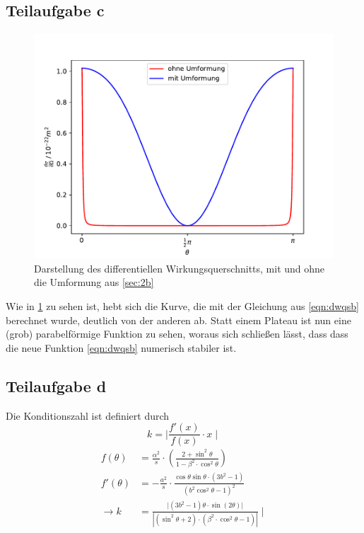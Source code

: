 \subsection{Teilaufgabe c}
\begin{figure}[H]
  \centering
  \includegraphics[width=\textwidth]{Aufgabe02/diffquerschnitt.pdf}
  \caption{Darstellung des differentiellen Wirkungsquerschnitts, mit und ohne die Umformung aus \ref{sec:2b} }
  \label{fig:2b}
\end{figure}
Wie in \ref{fig:2b} zu sehen ist, hebt sich die Kurve, die mit der Gleichung aus \eqref{eqn:dwqsb} berechnet wurde, deutlich von der anderen ab.
Statt einem Plateau ist nun eine (grob) parabelförmige Funktion zu sehen, woraus sich schließen lässt, dass dass die neue Funktion \eqref{eqn:dwqsb} numerisch stabiler ist.

\subsection{Teilaufgabe d} \label{sec:2d}
Die Konditionszahl ist definiert durch
\begin{equation}
  k=\mid \frac{f'(x)}{f(x)} \cdot x \mid
\end{equation}
\begin{align}
  f(\theta) &= \frac{\alpha ^2}{s} \cdot \left(\frac{2+\sin^2{\theta}}{1-\beta^2 \cdot \cos^2{\theta}} \right) \\
  f'(\theta) &= -\frac{a^2}{s} \cdot \frac{\cos{\theta} \sin{\theta} \cdot \left(3b^2-1 \right)}{\left (b^2\cos^2{\theta}-1 \right)^2} \\
  \rightarrow k &=  \frac{|\left( 3b^2-1\right) \theta \cdot \sin {\left(2 \theta \right)|}}{| \left(\sin^2{\theta}+2 \right) \cdot \left(\beta^2 \cdot \cos^2{\theta}-1 \right )| } \mid
\end{align}

